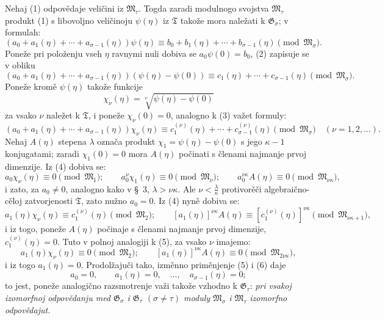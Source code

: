 \documentclass[11pt]{article}
\begin{document}
Nehaj (1) odpovědaje veličini iz $\mathfrak M_\tau$. Togda zaradi modulnogo
svojstva $\mathfrak M_\tau$ produkt (1) s libovoljno veličinoju $\psi(\eta)$ iz
$\mathfrak T$ takože mora naležati k $\mathfrak G_\sigma$; v formulah:
\begin{equation}
(a_0+a_1(\eta)+\cdots+a_{\sigma-1}(\eta))\psi(\eta)
\equiv b_0+b_1(\eta)+\cdots+b_{\sigma-1}(\eta)
\pmod{\mathfrak M_\sigma}.
\tag{2}
\end{equation}
Poneže pri položenju vseh $\eta$ ravnymi nuli dobiva se $a_0\psi(0)=b_0$,
(2) zapisuje se v obliku
\begin{equation}
(a_0+a_1(\eta)+\cdots+a_{\sigma-1}(\eta))(\psi(\eta)-\psi(0))
\equiv c_1(\eta)+\cdots+c_{\sigma-1}(\eta)
\pmod{\mathfrak M_\sigma}.
\tag{3}
\end{equation}
Poneže kromě $\psi(\eta)$ takože funkcije
\[
 \chi_\nu(\eta)=\sqrt[\nu]{\psi(\eta)-\psi(0)}
\]
za vsako $\nu$ naležet k $\mathfrak T$, i poneže $\chi_\nu(0)=0$, analogno k
(3) važet formuly:
\begin{equation}
(a_0+a_1(\eta)+\cdots+a_{\sigma-1}(\eta))\chi_\nu(\eta)
\equiv c_1^{(\nu)}(\eta)+\cdots+c_{\sigma-1}^{(\nu)}(\eta)
\pmod{\mathfrak M_\sigma}
\quad(\nu=1,2,\ldots).
\tag{4}
\end{equation}
Nehaj $A(\eta)$ stepena $\lambda$ označa produkt
$\chi_1=\psi(\eta)-\psi(0)$ s jego $\kappa-1$ konjugatami; zaradi
$\chi_1(0)=0$ mora $A(\eta)$ počinati s členami najmanje prvoj dimenzije. Iz
(4) dobiva se:
\begin{equation}
a_0\chi_\nu(\eta)\equiv0\pmod{\mathfrak M_1};\qquad
a_0^\nu\chi_1(\eta)\equiv0\pmod{\mathfrak M_\nu};\qquad
a_0^{\nu\kappa}A(\eta)\equiv0\pmod{\mathfrak M_{\nu\kappa}},
\tag{5}
\end{equation}
i zato, za $a_0\ne0$, analogno kako v \S\ 3, $\lambda>\nu\kappa$. Ale
$\nu<\frac{\lambda}{\kappa}$ protivorěči algebraično-cěloj zatvorjenosti
$\mathfrak T$, zato nužno $a_0=0$. Iz (4) nyně dobiva se:
\begin{equation}
a_1(\eta)\chi_\nu(\eta)\equiv c_1^{(\nu)}(\eta)\pmod{\mathfrak M_2};\qquad
[a_1(\eta)]^{\nu\kappa}A(\eta)
\equiv[c_1^{(\nu)}(\eta)]^{\nu\kappa}\pmod{\mathfrak M_{\nu\kappa+1}},
\tag{6}
\end{equation}
i iz togo, poneže $A(\eta)$ počinaje s členami najmanje prvoj dimenzije,
$c_1^{(\nu)}(\eta)=0$. Tuto v polnoj analogiji k (5), za vsako $\nu$ imajemo:
\[
 a_1(\eta)\chi_\nu(\eta)\equiv0\pmod{\mathfrak M_2};\qquad
 [a_1(\eta)]^{\nu\kappa}A(\eta)\equiv0\pmod{\mathfrak M_{2\nu\kappa}},
\]
i iz togo $a_1(\eta)=0$. Prodolžajuči tako, izměnno priměnjenje (5) i (6) daje
\[
 a_0=0,\qquad a_1(\eta)=0,\quad \ldots,\quad a_{\sigma-1}(\eta)=0;
\]
to jest, poneže analogično razsmotrenje važi takože vzhodno k
$\mathfrak G_\tau$: {\itshape pri vsakoj izomorfnoj odpovědanju med
$\mathfrak G_\sigma$ i $\mathfrak G_\tau$ $(\sigma\ne\tau)$ moduly
$\mathfrak M_\sigma$ i $\mathfrak M_\tau$ izomorfno odpovědajut.}
\end{document}
